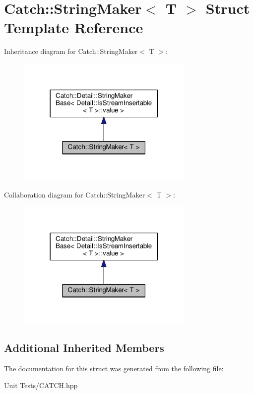\hypertarget{structCatch_1_1StringMaker}{}\section{Catch\+:\+:String\+Maker$<$ T $>$ Struct Template Reference}
\label{structCatch_1_1StringMaker}


Inheritance diagram for Catch\+:\+:String\+Maker$<$ T $>$\+:
\nopagebreak
\begin{figure}[H]
\begin{center}
\leavevmode
\includegraphics[width=242pt]{structCatch_1_1StringMaker__inherit__graph}
\end{center}
\end{figure}


Collaboration diagram for Catch\+:\+:String\+Maker$<$ T $>$\+:
\nopagebreak
\begin{figure}[H]
\begin{center}
\leavevmode
\includegraphics[width=242pt]{structCatch_1_1StringMaker__coll__graph}
\end{center}
\end{figure}
\subsection*{Additional Inherited Members}


The documentation for this struct was generated from the following file\+:\begin{DoxyCompactItemize}
\item 
Unit Tests/C\+A\+T\+C\+H.\+hpp\end{DoxyCompactItemize}
